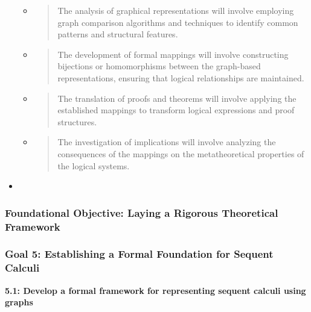 \begin{itemize}
  \begin{itemize}
  \item
    \begin{quote}
    The analysis of graphical representations will involve employing
    graph comparison algorithms and techniques to identify common
    patterns and structural features.
    \end{quote}
  \item
    \begin{quote}
    The development of formal mappings will involve constructing
    bijections or homomorphisms between the graph-based representations,
    ensuring that logical relationships are maintained.
    \end{quote}
  \item
    \begin{quote}
    The translation of proofs and theorems will involve applying the
    established mappings to transform logical expressions and proof
    structures.
    \end{quote}
  \item
    \begin{quote}
    The investigation of implications will involve analyzing the
    consequences of the mappings on the metatheoretical properties of
    the logical systems.
    \end{quote}
  \end{itemize}
\item
\end{itemize}

\hypertarget{foundational-objective-laying-a-rigorous-theoretical-framework}{%
\subsubsection{Foundational Objective: Laying a Rigorous Theoretical
Framework}\label{foundational-objective-laying-a-rigorous-theoretical-framework}}

\hypertarget{goal-5-establishing-a-formal-foundation-for-sequent-calculi}{%
\subsubsection{Goal 5: Establishing a Formal Foundation for Sequent
Calculi}\label{goal-5-establishing-a-formal-foundation-for-sequent-calculi}}

\textbf{5.1: Develop a formal framework for representing sequent calculi
using graphs}


